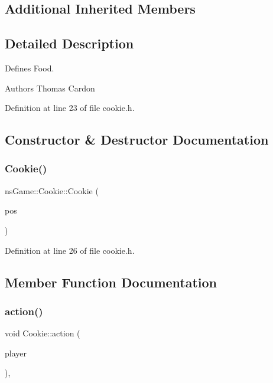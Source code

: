 \subsection*{Additional Inherited Members}


\subsection{Detailed Description}
Defines Food. 

\begin{DoxyAuthor}{Authors}
Thomas Cardon 
\end{DoxyAuthor}


Definition at line 23 of file cookie.\+h.



\subsection{Constructor \& Destructor Documentation}
\mbox{\label{classns_game_1_1_cookie_a2e6c34dfd2892c48dc4ce2b503504674}} 
\subsubsection{\texorpdfstring{Cookie()}{Cookie()}}
{\footnotesize\ttfamily ns\+Game\+::\+Cookie\+::\+Cookie (\begin{DoxyParamCaption}\item[{ns\+Graphics\+::\+Vec2D}]{pos }\end{DoxyParamCaption})\hspace{0.3cm}{\ttfamily [inline]}}



Definition at line 26 of file cookie.\+h.



\subsection{Member Function Documentation}
\mbox{\label{classns_game_1_1_cookie_a2cd4ee8c83b99191643d6e9ef2267b1a}} 
\subsubsection{\texorpdfstring{action()}{action()}}
{\footnotesize\ttfamily void Cookie\+::action (\begin{DoxyParamCaption}\item[{\hyperlink{classns_game_1_1_player}{Player} $\ast$}]{player }\end{DoxyParamCaption})\hspace{0.3cm}{\ttfamily [override]}, {\ttfamily [virtual]}}



